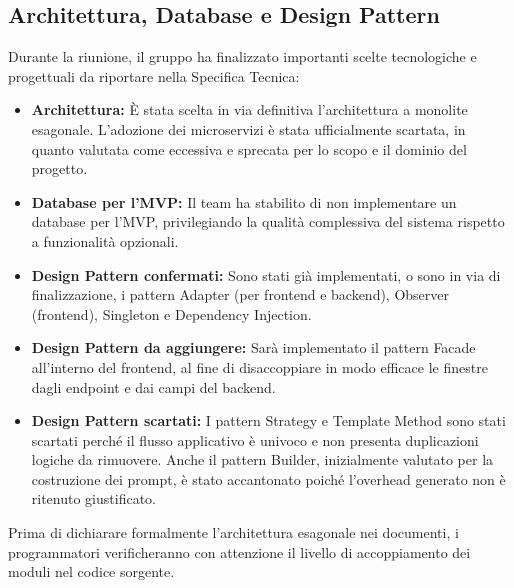 \documentclass[a4paper, 10pt, colorlinks=true, linkcolor=black, urlcolor=blue, citecolor=blue, hidelinks]{article}
\begin{document}
\subsection{Architettura, Database e Design Pattern}
Durante la riunione, il gruppo ha finalizzato importanti scelte tecnologiche e progettuali da riportare nella Specifica Tecnica:
\begin{itemize}
    \item \textbf{Architettura:} È stata scelta in via definitiva l'architettura a monolite esagonale. L'adozione dei microservizi è stata ufficialmente scartata, in quanto valutata come eccessiva e sprecata per lo scopo e il dominio del progetto.
    \item \textbf{Database per l'MVP:} Il team ha stabilito di non implementare un database per l'MVP, privilegiando la qualità complessiva del sistema rispetto a funzionalità opzionali.
    \item \textbf{Design Pattern confermati:} Sono stati già implementati, o sono in via di finalizzazione, i pattern Adapter (per frontend e backend), Observer (frontend), Singleton e Dependency Injection.
    \item \textbf{Design Pattern da aggiungere:} Sarà implementato il pattern Facade all'interno del frontend, al fine di disaccoppiare in modo efficace le finestre dagli endpoint e dai campi del backend.
    \item \textbf{Design Pattern scartati:} I pattern Strategy e Template Method sono stati scartati perché il flusso applicativo è univoco e non presenta duplicazioni logiche da rimuovere. Anche il pattern Builder, inizialmente valutato per la costruzione dei prompt, è stato accantonato poiché l'overhead generato non è ritenuto giustificato.
\end{itemize}
Prima di dichiarare formalmente l'architettura esagonale nei documenti, i programmatori verificheranno con attenzione il livello di accoppiamento dei moduli nel codice sorgente.
\end{document}
